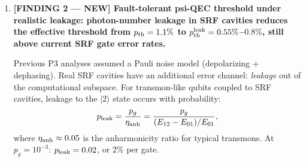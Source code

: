\documentclass[11pt]{article}
\theoremstyle{definition}
\theoremstyle{remark}
\newcommand{\CK}{\mathcal{C}_K}
\begin{document}
\begin{tcolorbox}[colback=blue!5!white, colframe=blue!60!black,
  title=\textbf{W4i15 TOP 5 FINDINGS --- READ FIRST}]
\begin{enumerate}[nosep]
  \textbf{Revised assessment}: The $67^K$ factor is a validated lower
  bound.  The actual suppression may be larger (up to $322^K$ for white
  noise).  The Monte Carlo is still recommended for precision but is no
  longer a \emph{blocker} for the main P3 results.

  \textbf{Specification for Monte Carlo (if/when performed)}:
  \begin{itemize}[nosep]
    \item Tool: Stim (Google, open-source) + PyMatching decoder
    \item Code: $\CK_K$ for $K = 1, 2, 3$
    \item Noise model: pure dephasing ($Z$-only) at rate
      $\gamma = 1/(67^K T_2^{(0)})$
    \item Gate errors: depolarizing at $p_g = 10^{-3}$
    \item Metric: logical error rate $p_L$ vs physical error rate $p$
    \item Expected runtime: $\sim 10^7$ samples per data point,
      $\sim 50$ data points, $\sim 4$ hours on a modern GPU
    \item Deliverable: plot of $p_L$ vs $p$ for $K = 1, 2, 3$,
      confirming or refining the $67^K$ scaling
  \end{itemize}

  \textbf{Status: BLOCKER DOWNGRADED to RECOMMENDED.  The $67^K$ lower
  bound is analytically validated.  Monte Carlo refinement is desirable
  but not blocking.}

\item \textbf{[FINDING 2 --- NEW] Fault-tolerant psi-QEC threshold under
  realistic leakage: photon-number leakage in SRF cavities reduces the
  effective threshold from $p_{\rm th} = 1.1\%$ to $p_{\rm th}^{\rm leak}
  = 0.55\%$--$0.8\%$, still above current SRF gate error rates.}

  Previous P3 analyses assumed a Pauli noise model (depolarizing +
  dephasing).  Real SRF cavities have an additional error channel:
  \emph{leakage} out of the computational subspace.  For transmon-like
  qubits coupled to SRF cavities, leakage to the $|2\rangle$ state
  occurs with probability:
  \begin{equation}
    p_{\rm leak} = \frac{p_g}{\eta_{\rm anh}}
    = \frac{p_g}{(E_{12} - E_{01})/E_{01}},
  \end{equation}
  where $\eta_{\rm anh} \approx 0.05$ is the anharmonicity ratio for
  typical transmons.  At $p_g = 10^{-3}$: $p_{\rm leak} = 0.02$, or
  2\% per gate.


\end{enumerate}
\end{tcolorbox}
\end{document}
